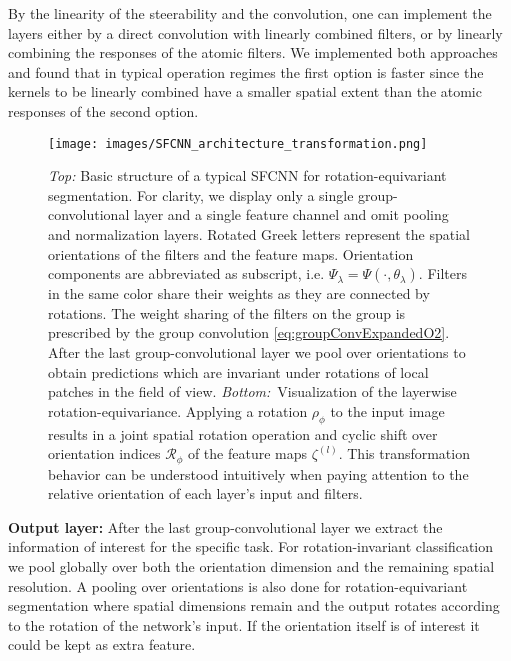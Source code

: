 \documentclass[10pt,twocolumn,letterpaper]{article}
\newcommand{\myparagraph}[1]{\vspace*{1ex}\noindent\textbf{#1}}
\begin{document}
By the linearity of the steerability and the convolution, one can implement the layers either by a direct convolution with linearly combined filters, or by linearly combining the responses of the atomic filters.
We implemented both approaches and found that in typical operation regimes the first option is faster since the kernels to be linearly combined have a smaller spatial extent than the atomic responses of the second option.


\begin{figure*}
	\centering
	\texttt{[image: images/SFCNN\_architecture\_transformation.png]}
	\vspace{-3.5ex}
	\caption{
		\emph{Top:} Basic structure of a typical \mbox{SFCNN} for rotation-equivariant segmentation.
		For clarity, we display only a single group-convolutional layer and a single feature channel and omit pooling and normalization layers.
		Rotated Greek letters represent the spatial orientations of the filters and the feature maps.
		Orientation components are abbreviated as subscript, i.e. $\Psi_{\lambda} = \Psi(\cdot, \theta_\lambda).$
		Filters in the same color share their weights as they are connected by rotations.
		The weight sharing of the filters on the group is prescribed by the group convolution \eqref{eq:groupConvExpandedO2}.
		After the last group-convolutional layer we pool over orientations to obtain predictions which are invariant under rotations of local patches in the field of view.
		\emph{Bottom:}~Visualization of the layerwise rotation-equivariance.
		Applying a rotation $\rho_\phi$ to the input image results in a joint spatial rotation operation and cyclic shift over orientation indices $\mathcal{R}_\phi$ of the feature maps $\zeta^{(l)}.$
		This transformation behavior can be understood intuitively when paying attention to the relative orientation of each layer's input and filters.
		}
	\label{fig:network}
	\vspace{-3ex}
\end{figure*}


\myparagraph{Output layer:}
After the last group-convolutional layer we extract the information of interest for the specific task.
For rotation-invariant classification we pool globally over both the orientation dimension and the remaining spatial resolution.
A pooling over orientations is also done for rotation-equivariant segmentation where spatial dimensions remain and the output rotates according to the rotation of the network's input.
If the orientation itself is of interest it could be kept as extra feature.
\end{document}
